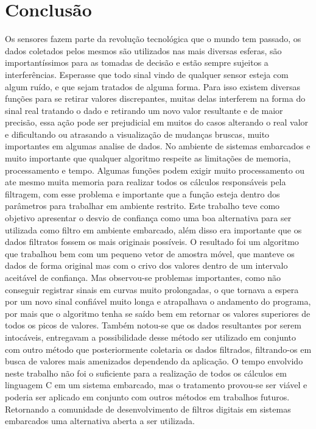 
\chapter{Conclusão}\label{cap:conclusao}

Os sensores fazem parte da revolução tecnológica que o mundo tem passado, os dados coletados pelos mesmos são utilizados nas mais diversas esferas, são importantíssimos para as tomadas de decisão e estão sempre sujeitos a interferências.
Esperasse que todo sinal vindo de qualquer sensor esteja com algum ruído, e que sejam tratados de alguma forma. Para isso existem diversas funções para se retirar valores discrepantes, muitas delas interferem na forma do sinal real tratando o dado e retirando um novo valor resultante e de maior precisão, essa ação pode ser prejudicial em muitos do casos alterando o real valor e dificultando ou atrasando a visualização de mudanças bruscas, muito importantes em algumas analise de dados. No ambiente de sistemas embarcados e muito importante que qualquer algoritmo respeite as limitações de memoria, processamento e tempo. Algumas funções podem exigir muito processamento ou ate mesmo muita memoria para realizar todos os cálculos responsáveis pela filtragem, com esse problema e importante que a função esteja dentro dos parâmetros para trabalhar em ambiente restrito.
Este trabalho teve como objetivo apresentar o desvio de confiança como uma boa alternativa para ser utilizada como filtro em ambiente embarcado, além disso era importante que os dados filtratos fossem os mais originais possíveis. O resultado foi um algoritmo que trabalhou bem com um pequeno vetor de amostra móvel, que manteve os dados de forma original mas com o crivo dos valores dentro de um intervalo aceitável de confiança. Mas observou-se problemas importantes, como não conseguir registrar sinais em curvas muito prolongadas, o que tornava a espera por um novo sinal confiável muito longa e atrapalhava o andamento do programa, por mais que o algoritmo tenha se saído bem em retornar os valores superiores de todos os picos de valores. Também notou-se que os dados resultantes por serem intocáveis, entregavam a possibilidade desse método ser utilizado em conjunto com outro método que posteriormente coletaria os dados filtrados, filtrando-os em busca de valores mais amenizados dependendo da aplicação. 
O tempo envolvido neste trabalho não foi o suficiente para a realização de todos os cálculos em linguagem C em um sistema embarcado, mas o tratamento provou-se ser viável e poderia ser aplicado em conjunto com outros métodos em trabalhos futuros. Retornando a comunidade de desenvolvimento de filtros digitais em sistemas embarcados uma alternativa aberta a ser utilizada.




